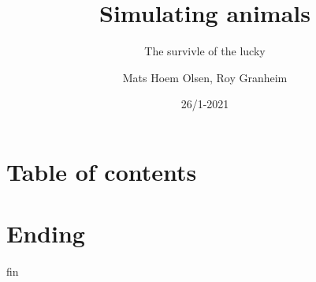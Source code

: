 \documentclass[12pt]{beamer}
\begin{document}
\author{Mats Hoem Olsen, Roy Granheim}
\title{Simulating animals}
\subtitle{The survivle of the lucky}
\date{26/1-2021}
\subject{INF200}

\begin{frame}
\maketitle
\end{frame}

\section{Table of contents}
\begin{frame}
\tableofcontents
\end{frame}

\setcounter{section}{0}





\section{Ending}
\begin{frame}{fin}
	\transduration<0-19>{0}
\end{frame}
\end{document}
